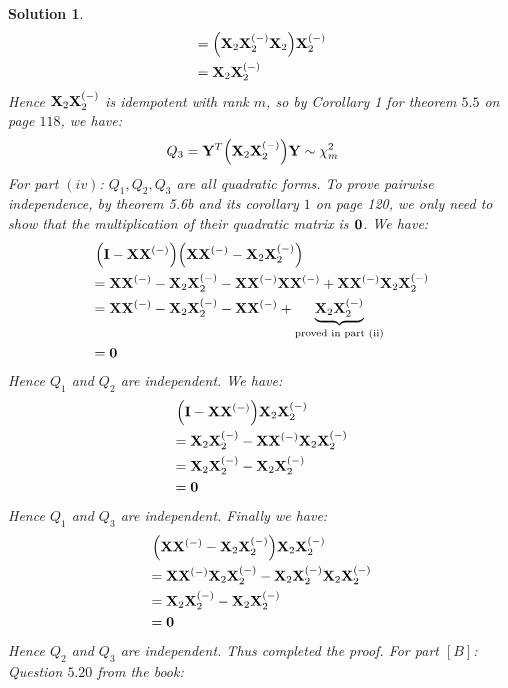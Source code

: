 \documentclass[11pt]{article}
\newtheorem{sol}{Solution}
\begin{document}
\begin{sol}
\begin{align*}
		&= \Big({\bf X}_2{\bf X}_2^{(-)}{\bf X}_2\Big){\bf X}_2^{(-)}\\
		&= {\bf X}_2{\bf X}_2^{(-)}
	\end{align*}
	Hence  ${\bf X}_2{\bf X}_2^{(-)}$ is idempotent with rank $m$, so by Corollary 1 for theorem $5.5$ on page $118$, we have:
	\begin{align*}
	Q_3 &= {\bf Y}^T\Big({\bf X}_2{\bf X}_2^{(-)}\Big){\bf Y} \sim \chi^2_{m} 
	\end{align*}
	For part $(iv)$:\vskip 2mm
	$Q_1, Q_2, Q_3$ are all quadratic forms. To prove pairwise independence, by theorem 5.6b and its corollary $1$ on page 120, we only need to show that the multiplication of their quadratic matrix is ${\bf 0}$.\vskip 2mm
	We have:
	\begin{align*}
		&\ \Big({\bf I} - {\bf X}{\bf X}^{(-)}\Big)\Big({\bf X}{\bf X}^{(-)} - {\bf X}_2{\bf X}_2^{(-)}\Big)\\
		&= {\bf X}{\bf X}^{(-)} - {\bf X}_2{\bf X}_2^{(-)} - {\bf X}{\bf X}^{(-)}{\bf X}{\bf X}^{(-)} + {\bf X}{\bf X}^{(-)}{\bf X}_2{\bf X}_2^{(-)}\\
		&= {\bf X}{\bf X}^{(-)} - {\bf X}_2{\bf X}_2^{(-)} - {\bf X}{\bf X}^{(-)} + \underbrace{{\bf X}_2{\bf X}_2^{(-)}}_{\text{proved in part (ii)}}\\
		&= {\bf 0}
	\end{align*}
	Hence $Q_1$ and $Q_2$ are independent.\vskip 2mm
	We have:
	\begin{align*}
		&\ \Big({\bf I} - {\bf X}{\bf X}^{(-)}\Big){\bf X}_2{\bf X}_2^{(-)}\\
		&= {\bf X}_2{\bf X}_2^{(-)} - {\bf X}{\bf X}^{(-)}{\bf X}_2{\bf X}_2^{(-)}\\
		&= {\bf X}_2{\bf X}_2^{(-)} - {\bf X}_2{\bf X}_2^{(-)}\\
		&= {\bf 0}
	\end{align*} 
	Hence $Q_1$ and $Q_3$ are independent.\vskip 2mm
	Finally we have:
	\begin{align*}
		&\ \Big({\bf X}{\bf X}^{(-)} - {\bf X}_2{\bf X}_2^{(-)}\Big){\bf X}_2{\bf X}_2^{(-)}\\
		&= {\bf X}{\bf X}^{(-)}{\bf X}_2{\bf X}_2^{(-)} - {\bf X}_2{\bf X}_2^{(-)}{\bf X}_2{\bf X}_2^{(-)}\\
		&= {\bf X}_2{\bf X}_2^{(-)} - {\bf X}_2{\bf X}_2^{(-)}\\
		&= {\bf 0}
	\end{align*}
	Hence $Q_2$ and $Q_3$ are independent.\vskip 2mm
	Thus completed the proof.\vskip 2mm
	For part $[B]$:\vskip 2mm
	Question $5.20$ from the book:\vskip 2mm

\end{sol}
\end{document}
